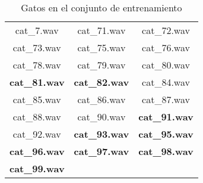 \documentclass[twocolumn,10pt]{asme2ej}
\begin{document}
\begin{table}[h]
\begin{tabular}{ccc}
cat\_7.wav & cat\_71.wav & cat\_72.wav\\
cat\_73.wav & cat\_75.wav & cat\_76.wav\\
cat\_78.wav & cat\_79.wav & cat\_80.wav\\
\textbf{cat\_81.wav} & \textbf{cat\_82.wav} & cat\_84.wav\\
cat\_85.wav & cat\_86.wav & cat\_87.wav\\
cat\_88.wav & cat\_90.wav & \textbf{cat\_91.wav}\\
cat\_92.wav & \textbf{cat\_93.wav} & \textbf{cat\_95.wav}\\
\textbf{cat\_96.wav} & \textbf{cat\_97.wav} & \textbf{cat\_98.wav}\\
\textbf{cat\_99.wav}
\end{tabular}
\label{tbl:conjunto_entre_gato}
\caption{Gatos en el conjunto de entrenamiento}
\end{table}
\end{document}
